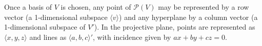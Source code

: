 Once a basis of $V$ is chosen, any point of $\mathcal{P}(V)$ may be represented by a row vector (a 1-dimensional subspace $\langle v \rangle$) and any hyperplane by a column vector (a 1-dimensional subspace of $V'$). In the projective plane, points are represented as $\langle x, y, z \rangle$ and lines as $\langle a, b, c \rangle'$, with incidence given by $ax + by + cz = 0$.
